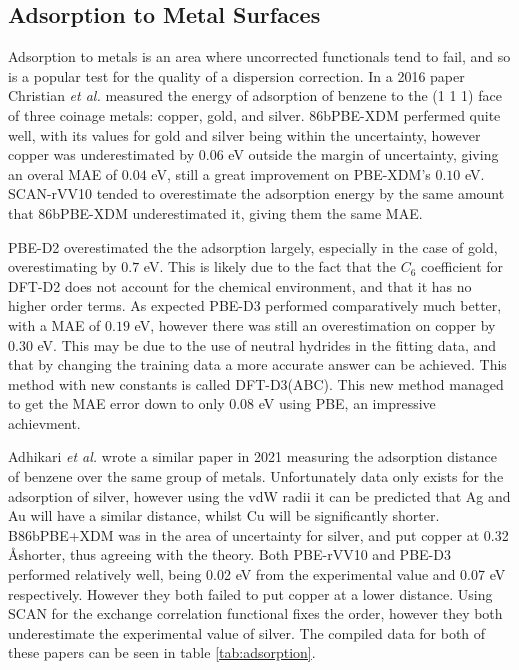 \documentclass[10pt,a4paper,twocolumn,twoside]{extarticle}
\newcommand{\al}{\emph{et al. }}
\newcommand{\oA}{\si{\angstrom}}
\begin{document}
	\subsection{Adsorption to Metal Surfaces}
	Adsorption to metals is an area where uncorrected functionals tend to fail, and so is a popular test for the quality of a dispersion correction. In a 2016 paper Christian \al measured\cite{Christian2016-CoinageAdsorption} the energy of adsorption of benzene to the (1 1 1) face of three coinage metals: copper, gold, and silver. 86bPBE-XDM perfermed quite well, with its values for gold and silver being within the uncertainty, however copper was underestimated by $0.06$ eV outside the margin of uncertainty, giving an overal MAE of  $0.04$ eV, still a great improvement on PBE-XDM's $0.10$ eV. SCAN-rVV10 tended to overestimate the adsorption energy by the same amount that 86bPBE-XDM underestimated it, giving them the same MAE. 

	PBE-D2 overestimated the the adsorption largely, especially in the case of gold, overestimating by $0.7$ eV. This is likely due to the fact that the $C_6$ coefficient for DFT-D2 does not account for the chemical environment, and that it has no higher order terms. As expected PBE-D3 performed comparatively much better, with a MAE of $0.19$ eV, however there was still an overestimation on copper by $0.30$ eV. This may be due to the use of neutral hydrides in the fitting data, and that by changing the training data a more accurate answer can be achieved. \cite{D3-ABC} This method with new constants is called DFT-D3(ABC). This new method managed to get the MAE error down to only $0.08$ eV using PBE, an impressive achievment.

	Adhikari \al wrote a similar paper in 2021 \cite{VV10-Adsorption} measuring the adsorption distance of benzene over the same group of metals. Unfortunately data only exists for the adsorption of silver, however using the vdW radii it can be predicted that Ag and Au will have a similar distance, whilst Cu will be significantly shorter. B86bPBE+XDM was in the area of uncertainty for silver, and put copper at 0.32 \oA shorter, thus agreeing with the theory. Both PBE-rVV10 and PBE-D3 performed relatively well, being 0.02 eV from the experimental value and 0.07 eV respectively. However they both failed to put copper at a lower distance. Using SCAN for the exchange correlation functional fixes the order, however they both underestimate the experimental value of silver. The compiled data for both of these papers can be seen in table \ref{tab:adsorption}.
\end{document}
